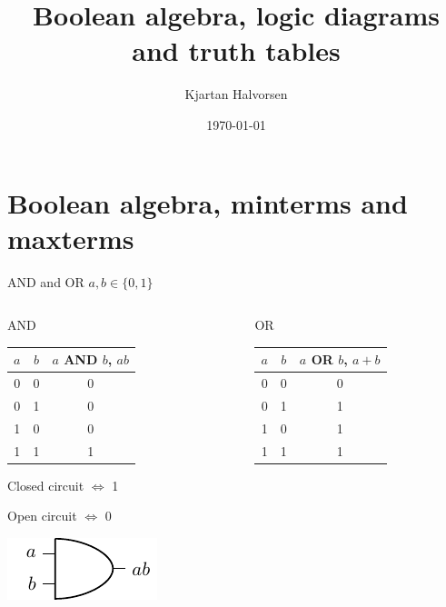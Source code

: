 \documentclass[presentation,aspectratio=1610]{beamer}
\author{Kjartan Halvorsen}
\date{\today}
\title{Boolean algebra, logic diagrams and truth tables}
\begin{document}
\maketitle

\section{Boolean algebra, minterms and maxterms}
\label{sec:org605a59f}
\begin{frame}[label={sec:orgb501097}]{AND and OR}
\(a, b \in \{0,1\}\)
\begin{columns}
\begin{column}{0.5\columnwidth}
\begin{block}{AND}
\begin{center}
\begin{tabular}{|cc|c|}
\hline
\(a\) & \(b\) & \(a\) AND \(b\), \(ab\)\\
\hline
0 & 0 & 0\\
0 & 1 & 0\\
1 & 0 & 0\\
1 & 1 & 1\\
\hline
\end{tabular}
\end{center}

\begin{center}
\end{center}
\alert{Closed circuit \(\Leftrightarrow\) 1}

\alert{Open circuit \(\Leftrightarrow\) 0}

\begin{center}
\includegraphics[width=0.5\linewidth]{../../figures/and-gate.pdf}
\end{center}
\end{block}
\end{column}

\begin{column}{0.5\columnwidth}
\begin{block}{OR}
\begin{center}
\begin{tabular}{|cc|c|}
\hline
\(a\) & \(b\) & \(a\) OR \(b\), \(a+b\)\\
\hline
0 & 0 & 0\\
0 & 1 & 1\\
1 & 0 & 1\\
1 & 1 & 1\\
\hline
\end{tabular}
\end{center}


\end{block}
\end{column}
\end{columns}
\end{frame}
\end{document}

